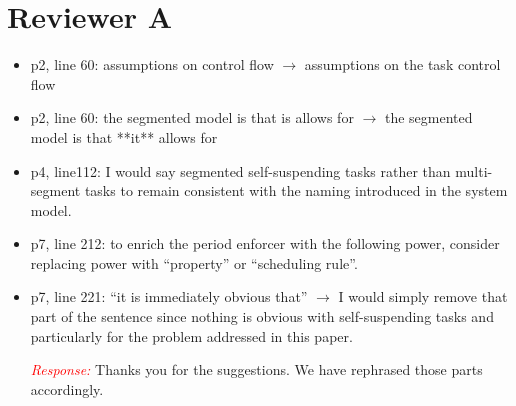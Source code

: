 \documentclass[12pt]{article}
\newenvironment{response}[0]{\textcolor{red}{\emph{Response: }}\color{blue}}{\medskip}
\begin{document}
\pagestyle{empty}

\section*{Reviewer A}

\begin{itemize}
	\item p2, line 60: assumptions on control flow $\rightarrow$ assumptions on
the task control flow
	\item p2, line 60: the segmented model is that is allows for $\rightarrow$ the
segmented model is that **it** allows for
	\item p4, line112: I would say segmented self-suspending tasks rather than
multi-segment tasks to remain consistent with the naming introduced in
the system model.
	\item p7, line 212:  to enrich the period enforcer with the following
power, consider replacing power with ``property'' or
``scheduling rule''.
	\item p7, line 221: ``it is immediately obvious that'' $\rightarrow$ I would simply
remove that part of the sentence since nothing is obvious with
self-suspending tasks and particularly for the problem addressed in this
paper.

\begin{response}
Thanks you for the suggestions. We have rephrased those parts accordingly.
	
\end{response}

\end{itemize}
\end{document}
